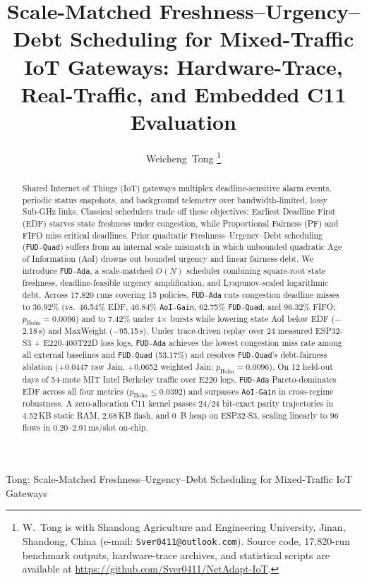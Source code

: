 \documentclass[journal]{IEEEtran}
\begin{document}
\title{Scale-Matched Freshness--Urgency--Debt Scheduling for Mixed-Traffic IoT Gateways: Hardware-Trace, Real-Traffic, and Embedded C11 Evaluation}

\author{Weicheng~Tong%
\thanks{W.~Tong is with Shandong Agriculture and Engineering University, Jinan, Shandong, China (e-mail: \texttt{Sver0411@outlook.com}). Source code, 17,820-run benchmark outputs, hardware-trace archives, and statistical scripts are available at \url{https://github.com/Sver0411/NetAdapt-IoT}.}}

%
{Tong: Scale-Matched Freshness--Urgency--Debt Scheduling for Mixed-Traffic IoT Gateways}

\maketitle

\begin{abstract}
Shared Internet of Things (IoT) gateways multiplex deadline-sensitive alarm events, periodic status snapshots, and background telemetry over bandwidth-limited, lossy Sub-GHz links. Classical schedulers trade off these objectives: Earliest Deadline First (EDF) starves state freshness under congestion, while Proportional Fairness (PF) and FIFO miss critical deadlines. Prior quadratic Freshness--Urgency--Debt scheduling (\texttt{FUD-Quad}) suffers from an internal scale mismatch in which unbounded quadratic Age of Information (AoI) drowns out bounded urgency and linear fairness debt. We introduce \texttt{FUD-Ada}, a scale-matched $O(N)$ scheduler combining square-root state freshness, deadline-feasible urgency amplification, and Lyapunov-scaled logarithmic debt. Across 17,820 runs covering 15 policies, \texttt{FUD-Ada} cuts congestion deadline misses to 36.92\% (vs.\ 46.54\% EDF, 46.84\% \texttt{AoI-Gain}, 62.75\% \texttt{FUD-Quad}, and 96.32\% FIFO; $p_{\text{Holm}}{=}0.0096$) and to 7.42\% under 4$\times$ bursts while lowering state AoI below EDF ($-$2.18\,s) and MaxWeight ($-$95.15\,s). Under trace-driven replay over 24 measured ESP32-S3 + E220-400T22D loss logs, \texttt{FUD-Ada} achieves the lowest congestion miss rate among all external baselines and \texttt{FUD-Quad} (53.17\%) and resolves \texttt{FUD-Quad}'s debt-fairness ablation (+0.0447 raw Jain, +0.0652 weighted Jain; $p_{\text{Holm}}{=}0.0096$). On 12 held-out days of 54-mote MIT Intel Berkeley traffic over E220 logs, \texttt{FUD-Ada} Pareto-dominates EDF across all four metrics ($p_{\text{Holm}}{\le}0.0392$) and surpasses \texttt{AoI-Gain} in cross-regime robustness. A zero-allocation C11 kernel passes 24/24 bit-exact parity trajectories in 4.52\,KB static RAM, 2.68\,KB flash, and 0~B heap on ESP32-S3, scaling linearly to 96 flows in 0.20--2.91\,ms/slot on-chip.
\end{abstract}
\end{document}
